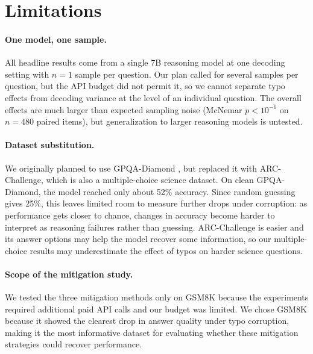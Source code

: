 \documentclass[11pt]{article}
\begin{document}
\section*{Limitations}

\paragraph{One model, one sample.}
All headline results come from a single 7B reasoning model at one decoding
setting with $n{=}1$ sample per question. Our plan called for several samples per
question, but the API budget did not permit it, so we cannot separate typo
effects from decoding variance at the level of an individual question. The
overall effects are much larger than expected sampling noise (McNemar
$p < 10^{-6}$ on $n{=}480$ paired items), but generalization to larger reasoning
models is untested.

\paragraph{Dataset substitution.}
We originally planned to use GPQA-Diamond \citep{rein2024}, but replaced it with ARC-Challenge,
which is also a multiple-choice science dataset. On clean GPQA-Diamond, the
model reached only about 52\% accuracy. Since random guessing gives 25\%, this
leaves limited room to measure further drops under corruption: as performance
gets closer to chance, changes in accuracy become harder to interpret as
reasoning failures rather than guessing. ARC-Challenge is easier and its answer
options may help the model recover some information, so our multiple-choice
results may underestimate the effect of typos on harder science questions.

\paragraph{Scope of the mitigation study.}
We tested the three mitigation methods only on GSM8K because the experiments
required additional paid API calls and our budget was limited. We chose GSM8K
because it showed the clearest drop in answer quality under typo corruption,
making it the most informative dataset for evaluating whether these mitigation
strategies could recover performance.

\end{document}
